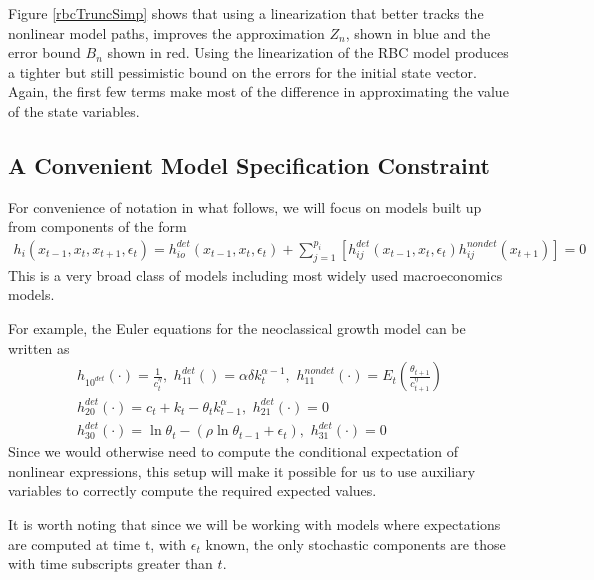 \documentclass[12pt]{article}
\begin{document}
Figure \ref{rbcTruncSimp} shows that using a 
linearization that better tracks the 
nonlinear model paths, improves the approximation $Z_n$, shown in blue  and the error bound $B_n$ shown in red.
Using the linearization of the RBC model produces a tighter but still pessimistic bound on the errors for the initial state vector.
Again, the first few terms make most of the difference in approximating the value of the state variables.


\subsection{A Convenient Model Specification Constraint}
\label{sec:convenient}



For convenience of notation in what follows, 
we will focus on models built up from components of the form
\begin{gather}
  h_i(x_{t-1},x_{t},x_{t+1},\epsilon_t)=h^{det}_{io}(x_{t-1},x_{t},\epsilon_t)+\sum_{j=1}^{p_i} [h^{det}_{ij}(x_{t-1},x_{t},\epsilon_t)h^{nondet}_{ij}(x_{t+1})]=0
\end{gather}
This is a very broad class of models including most widely used
macroeconomics models.

For example, the Euler equations for the  neoclassical growth  model 
\label{sec:simple-rbc-model-ext} can be written as
\begin{gather}
h_{10^{det}}(\cdot)=\frac{1}{c_t^\eta},\,\,
h_{11}^{det}()=\alpha \delta k_{t}^{\alpha-1} ,\,\,
h_{11}^{nondet}(\cdot)=E_t \left (\frac{\theta_{t+1}}{c_{t+1}^\eta} \right )\\
h_{20}^{det}(\cdot)=c_t + k_t-\theta_tk_{t-1}^\alpha,\,\,
h_{21}^{det}(\cdot)=0\\
h_{30}^{det}(\cdot)=\ln \theta_t -(\rho \ln \theta_{t-1} + \epsilon_t),\,\,
h_{31}^{det}(\cdot)=0
\end{gather}
Since we would otherwise  need to compute 
the conditional expectation of nonlinear expressions,  
this setup will make it possible for us to use auxiliary
variables to correctly compute the required expected values.

It is worth noting that since we will be working with models where expectations are computed at time t, with  $\epsilon_t$  known,  the only stochastic components are those with time subscripts greater than $t$. 
\end{document}
